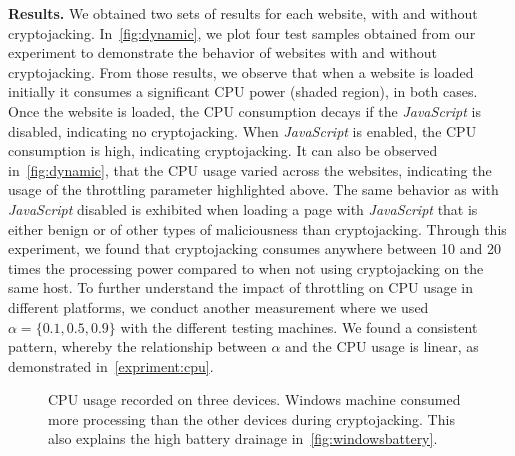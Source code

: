 \documentclass[acmlarge]{acmart}
\newcommand{\BfPara}[1]{{\noindent\bf#1.}\xspace\xspace}
\newcommand{\js}{{\em JavaScript}\xspace}
\newcommand{\cj}{cryptojacking\xspace}
\begin{document}
\BfPara{Results} We obtained two sets of results for each website, with and without \cj. In~\autoref{fig:dynamic}, we plot four test samples obtained from our experiment to demonstrate the behavior of websites with and without \cj. From those results, we observe that when a website is loaded initially it consumes a significant CPU power (shaded region), in both cases. Once the website is loaded, the CPU consumption decays if the \js is disabled, indicating no \cj. When \js is enabled, the CPU consumption is high, indicating \cj. It can also be observed in~\autoref{fig:dynamic}, that the CPU usage varied across the websites, indicating the usage of the throttling parameter highlighted above. The same behavior as with \js disabled is exhibited when loading a page with \js that is either benign or of other types of maliciousness than \cj. Through this experiment, we found that \cj consumes anywhere between 10 and 20 times the processing power compared to when not using \cj on the same host. To further understand the impact of throttling on CPU usage in different platforms, we conduct another measurement where we used $\alpha=\{0.1, 0.5, 0.9\}$ with the different testing machines. We found a consistent pattern, whereby the relationship between $\alpha$ and the CPU usage is linear, as demonstrated in~\autoref{expriment:cpu}.

\begin{figure}[]
\centering
\vspace{-3mm}
\caption{CPU usage recorded on three devices. Windows machine consumed more processing than the other devices during cryptojacking. This also explains the high battery drainage in~\autoref{fig:windowsbattery}. }
\vspace{-3mm}
\label{expriment:cpu}
\end{figure}
\end{document}
